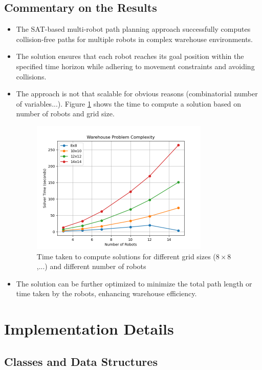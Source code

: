 \documentclass[8pt]{article}
\begin{document}
\subsection{Commentary on the Results}
\begin{itemize}
    \item The SAT-based multi-robot path planning approach successfully computes collision-free paths for multiple robots in complex warehouse environments.
    \item The solution ensures that each robot reaches its goal position within the specified time horizon while adhering to movement constraints and avoiding collisions.
    \item The approach is not that scalable for obvious reasons (combinatorial number of variables...). Figure \ref{fig:complexity_plot} shows the time to compute a solution based on number of robots and grid size.
    \begin{figure}
        \centering
        \includegraphics[width=0.8\textwidth]{figures/complexity_plot.png}
        \caption{Time taken to compute solutions for different grid sizes ($8\times8$,...) and different number of robots}
        \label{fig:complexity_plot}
    \end{figure}
    \item The solution can be further optimized to minimize the total path length or time taken by the robots, enhancing warehouse efficiency.
\end{itemize}

\section{Implementation Details}

\subsection{Classes and Data Structures}
\end{document}
